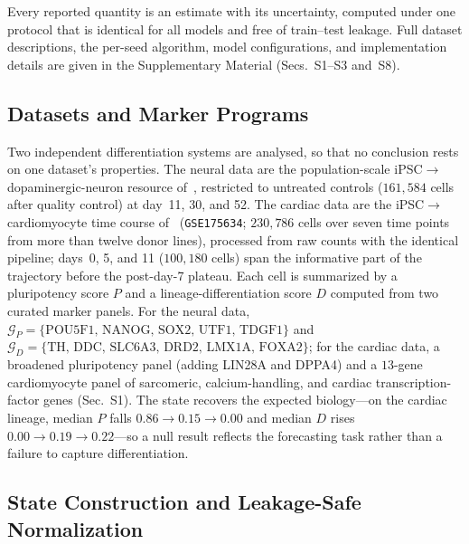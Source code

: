 \documentclass[10pt,journal,compsoc]{IEEEtran}
\begin{document}
Every reported quantity is an estimate with its uncertainty, computed under one protocol that is identical for all models and free of train--test leakage. Full dataset descriptions, the per-seed algorithm, model configurations, and implementation details are given in the Supplementary Material (Secs.~S1--S3 and~S8).

\subsection{Datasets and Marker Programs}
\label{subsec:data_state}

Two independent differentiation systems are analysed, so that no conclusion rests on one dataset's properties. The neural data are the population-scale iPSC$\rightarrow$dopaminergic-neuron resource of~\cite{jerber2021population}, restricted to untreated controls ($161{,}584$ cells after quality control) at day~11, 30, and 52. The cardiac data are the iPSC$\rightarrow$cardiomyocyte time course of~\cite{elorbany2022single} (\texttt{GSE175634}; $230{,}786$ cells over seven time points from more than twelve donor lines), processed from raw counts with the identical pipeline; days~0, 5, and 11 ($100{,}180$ cells) span the informative part of the trajectory before the post-day-7 plateau. Each cell is summarized by a pluripotency score $P$ and a lineage-differentiation score $D$ computed from two curated marker panels. For the neural data, $\mathcal{G}_P=\{\mathrm{POU5F1,\,NANOG,\,SOX2,\,UTF1,\,TDGF1}\}$ and $\mathcal{G}_D=\{\mathrm{TH,\,DDC,\,SLC6A3,\,DRD2,\,LMX1A,\,FOXA2}\}$; for the cardiac data, a broadened pluripotency panel (adding LIN28A and DPPA4) and a $13$-gene cardiomyocyte panel of sarcomeric, calcium-handling, and cardiac transcription-factor genes (Sec.~S1). The state recovers the expected biology---on the cardiac lineage, median $P$ falls $0.86\!\rightarrow\!0.15\!\rightarrow\!0.00$ and median $D$ rises $0.00\!\rightarrow\!0.19\!\rightarrow\!0.22$---so a null result reflects the forecasting task rather than a failure to capture differentiation.

\subsection{State Construction and Leakage-Safe Normalization}
\label{subsec:state}
\end{document}
